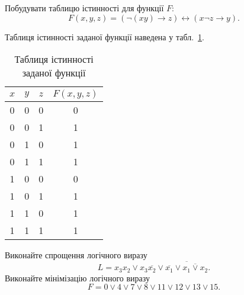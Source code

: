 \documentclass[a4paper,oneside,DIV=12,12pt]{scrartcl}
\renewcommand{\implies}{\rightarrow}
\newcommand\barneg[1]{\overline{#1}}
\newcommand{\logicequiv}{\leftrightarrow}
\begin{document}
	\begin{exercise}
		Побудувати таблицю істинності для функції $F$:
		\[
			F(x, y, z) = \left( \neg{(xy)} \implies z\right) \logicequiv \left( x \neg{z} \implies y \right).
		\]
	\end{exercise}
	
	\begin{solution}
		Таблиця істинності заданої функції наведена у табл.~\ref{tab:ex2-truth-table}.
		
		\begin{table}[!htbp]
		\centering
			\begin{tabular}{cccc}
				\toprule
					$x$ & $y$ & $z$ & $F(x, y, z)$\\
				\midrule
					0   & 0   & 0   & 0\\
					0   & 0   & 1   & 1\\
					0   & 1   & 0   & 1\\
					0   & 1   & 1   & 1\\
					1   & 0   & 0   & 0\\
					1   & 0   & 1   & 1\\
					1   & 1   & 0   & 1\\
					1   & 1   & 1   & 1\\
				\bottomrule
			\end{tabular}
		\caption{Таблиця істинності заданої функції}
		\label{tab:ex2-truth-table}
		\end{table}
	\end{solution}
	
	\begin{exercise}
		Виконайте спрощення логічного виразу
		\[
			L = x_3x_2 \lor x_3 \barneg{x_2} \lor \barneg{\barneg{x_1} \lor \barneg{x_1 \lor x_2} }.
		\]
		Виконайте мінімізацію логічного виразу
		\[
			F = 0 \lor 4 \lor 7 \lor 8 \lor 11 \lor 12 \lor 13 \lor 15.
		\]
	\end{exercise}
	
\end{document}
